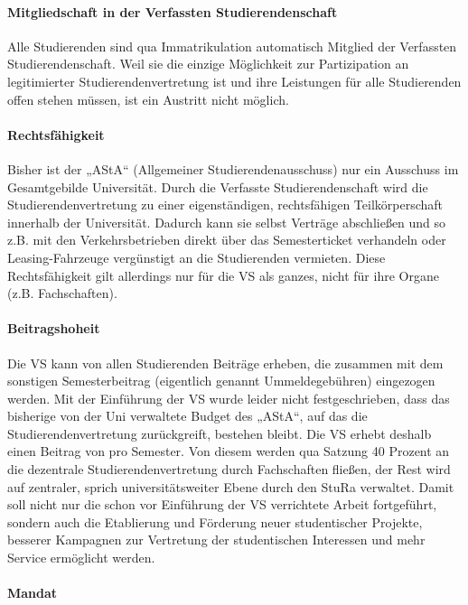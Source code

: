 \paragraph{Mitgliedschaft in der Verfassten Studierendenschaft}

Alle Studierenden sind qua Immatrikulation automatisch Mitglied der Verfassten
Studierendenschaft. Weil sie die einzige Möglichkeit zur Partizipation an
legitimierter Studierendenvertretung ist und ihre Leistungen für alle
Studierenden offen stehen müssen, ist ein Austritt nicht möglich.

\paragraph{Rechtsfähigkeit}

Bisher ist der „AStA“ (Allgemeiner Studierendenausschuss) nur ein Ausschuss im
Gesamtgebilde Universität. Durch die Verfasste Studierendenschaft wird die
Studierendenvertretung zu einer eigenständigen, rechtsfähigen Teilkörperschaft
innerhalb der Universität. Dadurch kann sie selbst Verträge abschließen und so
z.B. mit den Verkehrsbetrieben direkt über das Semesterticket verhandeln oder
Leasing-Fahrzeuge vergünstigt an die Studierenden vermieten.  Diese
Rechtsfähigkeit gilt allerdings nur für die VS als ganzes, nicht für ihre
Organe (z.B. Fachschaften).

\paragraph{Beitragshoheit}

Die VS kann von allen Studierenden Beiträge erheben, die zusammen mit dem
sonstigen Semesterbeitrag (eigentlich genannt Ummeldegebühren) eingezogen
werden. Mit der Einführung der VS wurde leider nicht festgeschrieben, dass das
bisherige von der Uni verwaltete Budget des „AStA“, auf das die
Studierendenvertretung zurückgreift, bestehen bleibt.  Die VS erhebt deshalb
einen Beitrag von  pro Semester. Von diesem werden qua Satzung 40
Prozent an die dezentrale Studierendenvertretung durch Fachschaften fließen,
der Rest wird auf zentraler, sprich universitätsweiter Ebene durch den StuRa
verwaltet. Damit soll nicht nur die schon vor Einführung der VS verrichtete
Arbeit fortgeführt, sondern auch die Etablierung und Förderung neuer
studentischer Projekte, besserer Kampagnen zur Vertretung der studentischen
Interessen und mehr Service ermöglicht werden.

\paragraph{Mandat}

